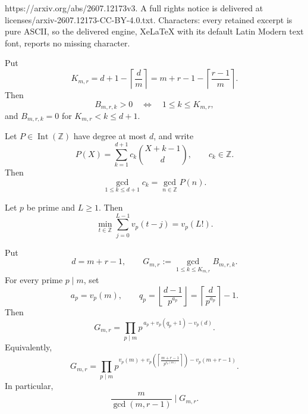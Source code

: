 \documentclass[10pt,a4paper]{amsart}
\newcommand{\Int}{\operatorname{Int}}
\newcommand{\Z}{\mathbb Z}
\begin{document}
https://arxiv.org/abs/2607.12173v3. A full rights notice is delivered at licenses/arxiv-2607.12173-CC-BY-4.0.txt. Characters: every retained excerpt is pure ASCII, so the delivered engine, XeLaTeX with its default Latin Modern text font, reports no missing character.
\begin{proposition}
\label{prop:support}
Put
\[
 K_{m,r}
 =
 d+1-\left\lceil\frac dm\right\rceil
 =
 m+r-1-\left\lceil\frac{r-1}{m}\right\rceil.
\]
Then
\[
 B_{m,r,k}>0\quad\Longleftrightarrow\quad 1\le k\le K_{m,r},
\]
and $B_{m,r,k}=0$ for $K_{m,r}<k\le d+1$.
\end{proposition}

\begin{lemma}
\label{lem:fixed-divisor}
Let $P\in\Int(\Z)$ have degree at most $d$, and write
\[
 P(X)=\sum_{k=1}^{d+1}c_k\binom{X+k-1}{d},
 \qquad c_k\in\Z.
\]
Then
\[
 \gcd_{1\le k\le d+1}c_k
 =
 \gcd_{n\in\Z}P(n).
\]
\end{lemma}

\begin{lemma}
\label{lem:consecutive-vp}
Let $p$ be prime and $L\ge1$. Then
\[
 \min_{t\in\Z}\sum_{j=0}^{L-1}v_p(t-j)=v_p(L!).
\]
\end{lemma}

\begin{theorem}
\label{thm:exact-gcd}
Put
\[
 d=m+r-1,
 \qquad
 G_{m,r}:=\gcd_{1\le k\le K_{m,r}}B_{m,r,k}.
\]
For every prime $p\mid m$, set
\[
 a_p=v_p(m),
 \qquad
 q_p=\left\lfloor\frac{d-1}{p^{a_p}}\right\rfloor
     =\left\lceil\frac{d}{p^{a_p}}\right\rceil-1.
\]
Then
\begin{equation}
\label{eq:exact-gcd}
 G_{m,r}
 =
 \prod_{p\mid m}
 p^{\,a_p+v_p(q_p+1)-v_p(d)}.
\end{equation}
Equivalently,
\[
 G_{m,r}
 =
 \prod_{p\mid m}
 p^{
 v_p(m)
 +v_p\!\left(
 \left\lceil\frac{m+r-1}{p^{v_p(m)}}\right\rceil
 \right)
 -v_p(m+r-1)
 }.
\]
In particular,
\[
 \frac{m}{\gcd(m,r-1)}\mid G_{m,r}.
\]
\end{theorem}
\end{document}
